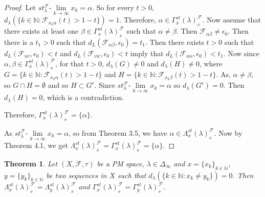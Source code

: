 \documentclass[reqno,b5paper]{amsart}
\theoremstyle{plain}
\newtheorem{thm}{Theorem}[section]
\theoremstyle{definition}
\begin{document}
\begin{proof}
Let $st^\mathcal{F}_\lambda\mbox{-}\lim\limits_{k\rightarrow
\infty}x_k = \alpha$. So for every $t>0$,
$d_\lambda(\{k\in\mathbb{N}:\mathcal{F}_{x_k\alpha}(t)>1-t\})=1$.
Therefore, $\alpha\in\Gamma_x^{st}(\lambda)^\mathcal{F}_{s}$. Now
assume that there exists at least one
$\beta\in\Gamma_x^{st}(\lambda)^\mathcal{F}_{s}$ such that
$\alpha\neq\beta$. Then $\mathcal{F}_{\alpha\beta}\neq\epsilon_0$.
Then there is a $t_1>0$ such that
$d_L(\mathcal{F}_{\alpha\beta},\epsilon_0)=t_1$. Then there exists
$t>0$ such that $d_L(\mathcal{F}_{uv},\epsilon_0)<t$ and
$d_L(\mathcal{F}_{vw},\epsilon_0)<t $ imply that
$d_L(\mathcal{F}_{uw},\epsilon_0)<t_1$. Now since
$\alpha,\beta\in\Gamma_x^{st}(\lambda)^\mathcal{F}_{s}$, for that
$t>0$, $d_\lambda(G)\neq 0$ and $d_\lambda(H)\neq 0$, where
$G=\{k\in\mathbb{N}: \mathcal{F}_{x_k\alpha}(t)> 1-t\}$ and
$H=\{k\in\mathbb{N}: \mathcal{F}_{x_k\beta}(t)> 1-t\}$. As,
$\alpha\neq\beta$, so $G\cap H=\emptyset$ and so $H\subset G^c$.
Since $st^\mathcal{F}_\lambda\mbox{-}\lim\limits_{k\rightarrow
\infty}x_k = \alpha$ so $d_\lambda(G^c)=0$. Then $d_\lambda(H)=0$,
which is a contradiction.

Therefore, $\Gamma_x^{st}(\lambda)^\mathcal{F}_{s}=\{\alpha\}$.

As $st^\mathcal{F}_\lambda\mbox{-}\lim\limits_{k\rightarrow
\infty}x_k = \alpha$, so from Theorem 3.5, we have
$\alpha\in\Lambda_x^{st}(\lambda)^\mathcal{F}_{s}$. Now by Theorem
4.1, we get
$\Lambda_x^{st}(\lambda)^\mathcal{F}_{s}=\Gamma_x^{st}(\lambda)^\mathcal{F}_{s}=\{\alpha\}$.
\end{proof}
\begin{thm}
Let $(X,\mathcal{F},\tau)$ be a PM space,
$\lambda\in\Delta_\infty$ and $x=\{x_k\}_{k\in \mathbb N}$,
$y=\{y_k\}_{k\in\mathbb N}$ be two sequences in $X$ such that
$d_\lambda(\{k\in \mathbb{N} : x_k \neq y_k \})=0$. Then
$\Lambda_x^{st}(\lambda)^\mathcal{F}_{s}=\Lambda_y^{st}(\lambda)^\mathcal{F}_{s}$
and $\Gamma_x^{st}(\lambda)^\mathcal{F}_{s}=
\Gamma_y^{st}(\lambda)^\mathcal{F}_{s}$.
\end{thm}
\end{document}
